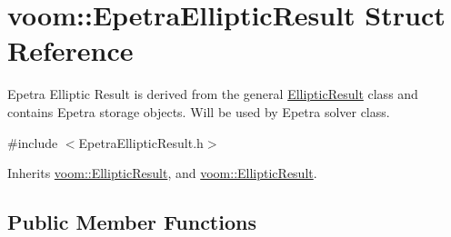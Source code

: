 \hypertarget{structvoom_1_1_epetra_elliptic_result}{
\section{voom::EpetraEllipticResult Struct Reference}
\label{structvoom_1_1_epetra_elliptic_result}
}


Epetra Elliptic Result is derived from the general \hyperlink{structvoom_1_1_elliptic_result}{EllipticResult} class and contains Epetra storage objects. Will be used by Epetra solver class.  


{\ttfamily \#include $<$EpetraEllipticResult.h$>$}

Inherits \hyperlink{structvoom_1_1_elliptic_result}{voom::EllipticResult}, and \hyperlink{structvoom_1_1_elliptic_result}{voom::EllipticResult}.\subsection*{Public Member Functions}
